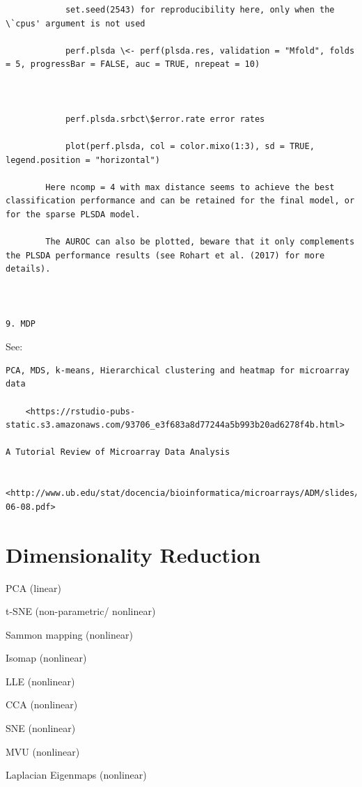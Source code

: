 \documentclass[
]{book}
\begin{document}
\begin{verbatim}
            set.seed(2543) for reproducibility here, only when the \`cpus' argument is not used

            perf.plsda \<- perf(plsda.res, validation = "Mfold", folds = 5, progressBar = FALSE, auc = TRUE, nrepeat = 10)



            perf.plsda.srbct\$error.rate error rates

            plot(perf.plsda, col = color.mixo(1:3), sd = TRUE, legend.position = "horizontal")

        Here ncomp = 4 with max distance seems to achieve the best classification performance and can be retained for the final model, or for the sparse PLSDA model.

        The AUROC can also be plotted, beware that it only complements the PLSDA performance results (see Rohart et al. (2017) for more details).



9. MDP
\end{verbatim}

See:

\begin{verbatim}
PCA, MDS, k-means, Hierarchical clustering and heatmap for microarray data

    <https://rstudio-pubs-static.s3.amazonaws.com/93706_e3f683a8d77244a5b993b20ad6278f4b.html>

A Tutorial Review of Microarray Data Analysis

    <http://www.ub.edu/stat/docencia/bioinformatica/microarrays/ADM/slides/A_Tutorial_Review_of_Microarray_data_Analysis_17-06-08.pdf>
\end{verbatim}

\hypertarget{dimensionality-reduction}{%
\section{Dimensionality Reduction}\label{dimensionality-reduction}}

PCA (linear)

t-SNE (non-parametric/ nonlinear)

Sammon mapping (nonlinear)

Isomap (nonlinear)

LLE (nonlinear)

CCA (nonlinear)

SNE (nonlinear)

MVU (nonlinear)

Laplacian Eigenmaps (nonlinear)
\end{document}
